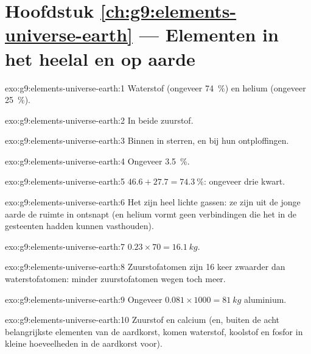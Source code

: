 \section*{Hoofdstuk \ref{ch:g9:elements-universe-earth} --- Elementen in het heelal en op aarde}

\begin{solution}{exo:g9:elements-universe-earth:1}
Waterstof (ongeveer \qty{74}{\percent}) en helium (ongeveer
\qty{25}{\percent}).
\end{solution}

\begin{solution}{exo:g9:elements-universe-earth:2}
In beide zuurstof.
\end{solution}

\begin{solution}{exo:g9:elements-universe-earth:3}
Binnen in sterren, en bij hun ontploffingen.
\end{solution}

\begin{solution}{exo:g9:elements-universe-earth:4}
Ongeveer \qty{3.5}{\percent}.
\end{solution}

\begin{solution}{exo:g9:elements-universe-earth:5}
$46.6 + 27.7 = \qty{74.3}{\percent}$: ongeveer drie kwart.
\end{solution}

\begin{solution}{exo:g9:elements-universe-earth:6}
Het zijn heel lichte gassen: ze zijn uit de jonge aarde de ruimte in
ontsnapt (en helium vormt geen verbindingen die het in de gesteenten
hadden kunnen vasthouden).
\end{solution}

\begin{solution}{exo:g9:elements-universe-earth:7}
$0.23 \times 70 = \qty{16.1}{kg}$.
\end{solution}

\begin{solution}{exo:g9:elements-universe-earth:8}
Zuurstofatomen zijn 16 keer zwaarder dan waterstofatomen: minder
zuurstofatomen wegen toch meer.
\end{solution}

\begin{solution}{exo:g9:elements-universe-earth:9}
Ongeveer $0.081 \times 1000 = \qty{81}{kg}$ aluminium.
\end{solution}

\begin{solution}{exo:g9:elements-universe-earth:10}
Zuurstof en calcium (en, buiten de acht belangrijkste elementen van de
aardkorst, komen waterstof, koolstof en fosfor in kleine hoeveelheden in
de aardkorst voor).
\end{solution}

